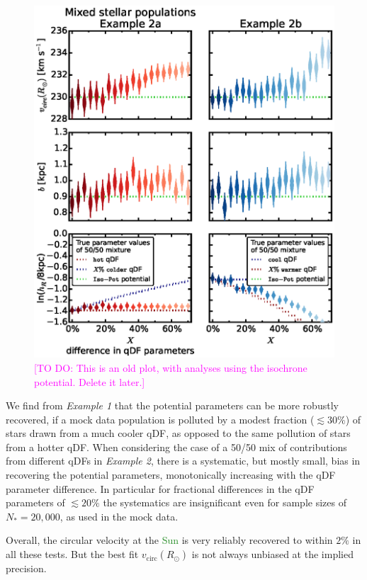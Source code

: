 \documentclass[iop,revtex4]{emulateapj}
\newcommand{\NEW}[1]{\textcolor{ForestGreen}{#1}}
\newcommand{\Wilma}[1]{\textcolor{Magenta}{#1}}
\newcommand{\OLD}[1]{}
\begin{document}
\begin{figure}[!htbp]
\centering
\includegraphics[scale=0.55]{figs/isoSphFlexMixDiff_violins_2.eps}
\caption{\Wilma{[TO DO: This is an old plot, with analyses using the isochrone potential. Delete it later.]}}
\end{figure}

We find from \emph{Example 1} that the potential parameters can be more robustly recovered, if a mock data population is polluted by a modest fraction ($\lesssim 30\%$) of stars drawn from a much cooler qDF, as opposed to the same pollution of stars from a hotter qDF. When considering the case of a 50/50 mix of contributions from different qDFs in \emph{Example 2}, there is a systematic, but mostly small, bias in recovering the potential parameters, monotonically increasing with the qDF parameter difference. In particular for fractional differences in the qDF parameters of $\lesssim 20\%$ the systematics are insignificant even for sample sizes of $N_{*} = 20,000$, as used in the mock data.

Overall, the circular velocity at the \OLD{sun}\NEW{Sun} is very reliably recovered to within $2\%$ in all these tests. But the best fit $v_\text{circ}(R_\odot)$ is not always unbiased at the implied precision.
\end{document}
